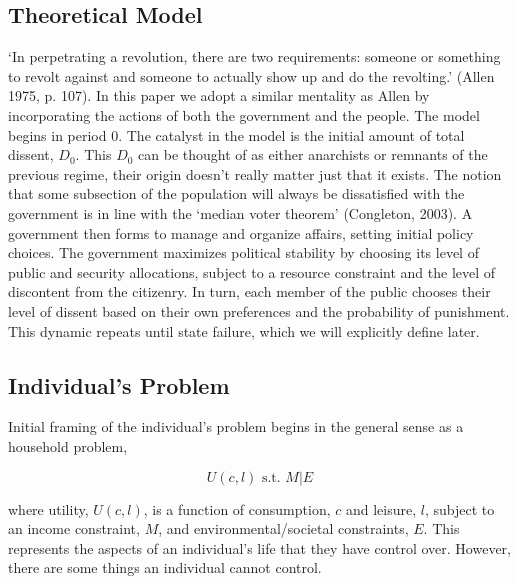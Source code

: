 \documentclass[12pt]{article}
\begin{document}
\begin{spacing}{1.5}
\section{Theoretical Model}

`In perpetrating a revolution, there are two requirements: someone or something to revolt against and someone to actually show up and do the revolting.' (Allen 1975, p. 107). In this paper we adopt a similar mentality as Allen by incorporating the actions of both the government and the people. The model begins in period 0. The catalyst in the model is the initial amount of total dissent, $D_0$. This $D_0$ can be thought of as either anarchists or remnants of the previous regime, their origin doesn't really matter just that it exists. The notion that some subsection of the population will always be dissatisfied with the government is in line with the `median voter theorem' (Congleton, 2003). A government then forms to manage and organize affairs, setting initial policy choices. The government maximizes political stability by choosing its level of public and security allocations, subject to a resource constraint and the level of discontent from the citizenry. In turn, each member of the public chooses their level of dissent based on their own preferences and the probability of punishment. This dynamic repeats until state failure, which we will explicitly define later. 
 
\subsection{Individual's Problem}

Initial framing of the individual's problem  begins in the general sense as a household problem, 

\begin{equation}
	U(c,l) \text{ s.t. } M|E
\end{equation}

\noindent where utility, $U(c,l)$, is a function of consumption, $c$ and leisure, $l$, subject to an income constraint, $M$, and environmental/societal constraints, $E$. This represents the aspects of an individual's life that they have control over. However, there are some things an individual cannot control.  


\end{spacing}
\end{document}
